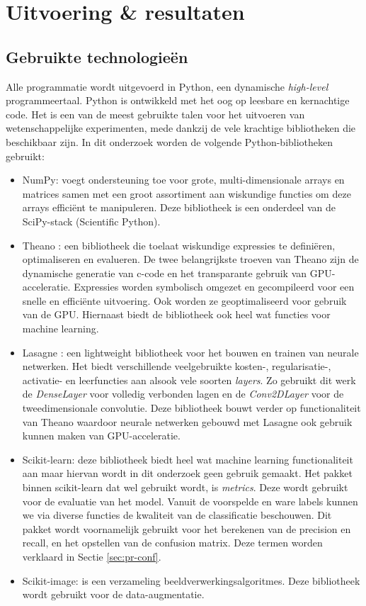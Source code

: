 \chapter{Uitvoering \& resultaten}
\section{Gebruikte technologie\"en}
Alle programmatie wordt uitgevoerd in Python, een dynamische \textit{high-level} programmeertaal. Python is ontwikkeld met het oog op leesbare en kernachtige code. Het is een van de meest gebruikte talen voor het uitvoeren van wetenschappelijke experimenten, mede dankzij de vele krachtige bibliotheken die beschikbaar zijn. In dit onderzoek worden de volgende Python-bibliotheken gebruikt:

\begin{itemize}
	\item NumPy: voegt ondersteuning toe voor grote, multi-dimensionale arrays en matrices samen met een groot assortiment aan wiskundige functies om deze arrays effici\"ent te  manipuleren. Deze bibliotheek is een onderdeel van de SciPy-stack (Scientific Python).
	\item Theano \cite{theano}:  een bibliotheek die toelaat wiskundige expressies te defini\"eren, optimaliseren en evalueren. De twee belangrijkste troeven van Theano zijn de dynamische generatie van c-code en het transparante gebruik van GPU-acceleratie. Expressies worden symbolisch omgezet en gecompileerd voor een snelle en effici\"ente uitvoering. Ook worden ze geoptimaliseerd  voor gebruik van de GPU.  Hiernaast biedt de bibliotheek ook heel wat functies voor machine learning. 
	\item Lasagne \cite{lasagne}: een lightweight bibliotheek voor het bouwen en trainen van neurale netwerken. Het biedt verschillende veelgebruikte kosten-, regularisatie-, activatie- en leerfuncties aan alsook vele soorten \textit{layers}. Zo gebruikt dit werk de \textit{DenseLayer} voor volledig verbonden lagen en de \textit{Conv2DLayer} voor de tweedimensionale convolutie. Deze bibliotheek bouwt verder op functionaliteit van Theano waardoor neurale netwerken gebouwd met Lasagne ook gebruik kunnen maken van GPU-acceleratie.
	\item Scikit-learn: deze bibliotheek biedt heel wat machine learning functionaliteit aan maar hiervan wordt in dit onderzoek geen gebruik gemaakt. Het pakket binnen scikit-learn dat wel gebruikt wordt, is \textit{metrics}. Deze wordt gebruikt voor de evaluatie van het model. Vanuit de voorspelde en ware labels kunnen we via diverse functies de kwaliteit van de classificatie beschouwen. Dit pakket wordt voornamelijk gebruikt voor het berekenen van de precision en recall, en het opstellen van de confusion matrix. Deze termen worden verklaard in Sectie \ref{sec:pr-conf}.
	\item Scikit-image: is een verzameling beeldverwerkingsalgoritmes. Deze bibliotheek wordt gebruikt voor de data-augmentatie.
	
\end{itemize}
